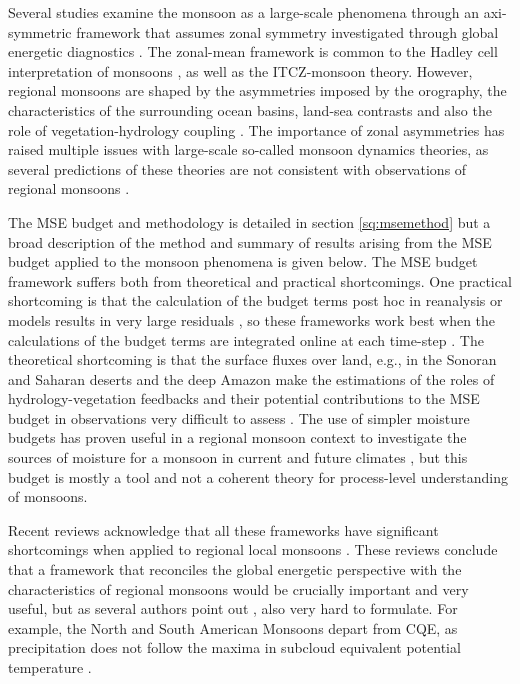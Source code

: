 Several studies examine the monsoon as a large-scale phenomena through an axi-symmetric framework that assumes zonal symmetry investigated through global energetic diagnostics \citep[e.g.][]{faulk2017effects,geen2019,byrne2020}. The zonal-mean framework is common to the Hadley cell interpretation of monsoons \citep{bordoni2008monsoons}, as well as the ITCZ-monsoon theory. %
However, regional monsoons are shaped by the asymmetries imposed by the orography, the characteristics of the surrounding ocean basins, land-sea contrasts and also the role of vegetation-hydrology coupling \citep{wang2017,pascale2019}. 
The importance of zonal asymmetries has raised multiple issues with large-scale so-called monsoon dynamics theories, as several predictions of these theories are not consistent with observations of regional monsoons \citep[e.g.][]{nie2010observational,smyth2018simulated,biasutti2018global,pascale2019}. 


The MSE budget and methodology is detailed in section \ref{sq:msemethod} but a broad description of the method and summary of results arising from the MSE budget applied to the monsoon phenomena is given below.
 The MSE budget framework suffers both from theoretical and practical shortcomings. One practical shortcoming is that the calculation of the budget terms post hoc in reanalysis or models results in very large residuals \citep{hill2019}, so these frameworks work best when the calculations of the budget terms are integrated online at each time-step \citep[e.g.][]{ma2019}.
The theoretical shortcoming is that the surface fluxes over land, e.g., in the Sonoran and Saharan deserts and the deep Amazon make the estimations of the roles of hydrology-vegetation feedbacks and their potential contributions to the MSE budget in observations very difficult to assess \citep{boos2016,pascale2019}. The use of simpler moisture budgets has proven useful in a regional monsoon context to investigate the sources of moisture for a monsoon in current  \citep{ordonez2019,martinez2019} and future climates \citep{smyth2020}, but this budget is mostly a tool and not a coherent theory for process-level understanding of monsoons.

Recent reviews acknowledge that all these frameworks have significant shortcomings when applied to regional local monsoons \citep{biasutti2018global,hill2019,geen2020}. These reviews conclude that a framework that reconciles the global energetic perspective with the characteristics of regional monsoons would be crucially important and very useful, but as several authors point out \citep[e.g.][]{biasutti2018global,hill2019}, also very hard to formulate. For example, the North and South American Monsoons depart from CQE, as precipitation does not follow the maxima in subcloud equivalent potential temperature \citep{nie2010observational,geen2020}. 

